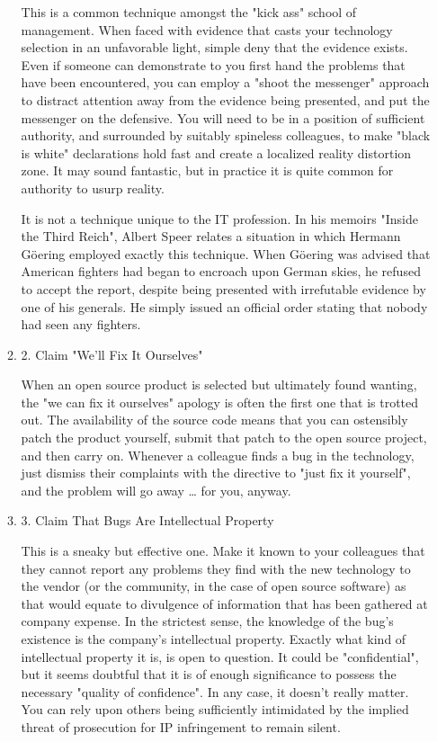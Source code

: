 \documentclass{article}
\begin{document}
\begin{enumerate}
\begin{enumerate}
This is a common technique amongst the "kick ass" school of management.
When faced with evidence that casts your technology selection in an
unfavorable light, simple deny that the evidence exists. Even if someone
can demonstrate to you first hand the problems that have been
encountered, you can employ a "shoot the messenger" approach to distract
attention away from the evidence being presented, and put the messenger
on the defensive. You will need to be in a position of sufficient
authority, and surrounded by suitably spineless colleagues, to make
"black is white" declarations hold fast and create a localized reality
distortion zone. It may sound fantastic, but in practice it is quite
common for authority to usurp reality.

It is not a technique unique to the IT profession. In his memoirs
"Inside the Third Reich", Albert Speer relates a situation in which
Hermann Göering employed exactly this technique. When Göering was
advised that American fighters had began to encroach upon German skies,
he refused to accept the report, despite being presented with
irrefutable evidence by one of his generals. He simply issued an
official order stating that nobody had seen any fighters.

\item 2. Claim "We'll Fix It Ourselves"
\label{sec:orgheadline38}

When an open source product is selected but ultimately found wanting,
the "we can fix it ourselves" apology is often the first one that is
trotted out. The availability of the source code means that you can
ostensibly patch the product yourself, submit that patch to the open
source project, and then carry on. Whenever a colleague finds a bug in
the technology, just dismiss their complaints with the directive to
"just fix it yourself", and the problem will go away \ldots{} for you,
anyway.

\item 3. Claim That Bugs Are Intellectual Property
\label{sec:orgheadline39}

This is a sneaky but effective one. Make it known to your colleagues
that they cannot report any problems they find with the new technology
to the vendor (or the community, in the case of open source software) as
that would equate to divulgence of information that has been gathered at
company expense. In the strictest sense, the knowledge of the bug's
existence is the company's intellectual property. Exactly what kind of
intellectual property it is, is open to question. It could be
"confidential", but it seems doubtful that it is of enough significance
to possess the necessary "quality of confidence". In any case, it
doesn't really matter. You can rely upon others being sufficiently
intimidated by the implied threat of prosecution for IP infringement to
remain silent.


\end{enumerate}
\end{enumerate}
\end{document}
